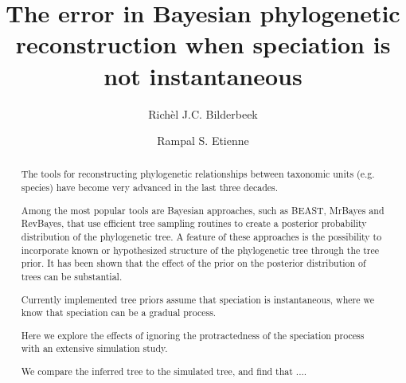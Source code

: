 \documentclass{article}
\title{The error in Bayesian phylogenetic reconstruction when speciation is not instantaneous}
\author[1]{Rich\`el J.C. Bilderbeek}
\author[1]{Rampal S. Etienne}
\affil[1]{Groningen Institute for Evolutionary Life Sciences, University of Groningen, Groningen, The Netherlands}
\begin{document}
\maketitle

\begin{abstract}



  The tools for reconstructing phylogenetic relationships between taxonomic 
  units (e.g. species) have become very advanced in the last three decades. 

  Among the most popular tools are Bayesian approaches, such as BEAST, MrBayes and RevBayes, 
  that use efficient tree sampling routines to create a posterior probability distribution 
  of the phylogenetic tree. 
  A feature of these approaches is the possibility to incorporate 
  known or hypothesized structure of the phylogenetic tree through the tree prior. 
  It has been shown that the effect of the prior on the posterior distribution 
  of trees can be substantial. 

  Currently implemented tree priors assume that speciation is instantaneous,
  where we know that speciation can be a gradual process.

  Here we explore the effects of ignoring 
  the protractedness of the speciation process with an extensive simulation study. 





  We compare the inferred tree to the simulated tree, and find that ....

\end{abstract}
\end{document}
